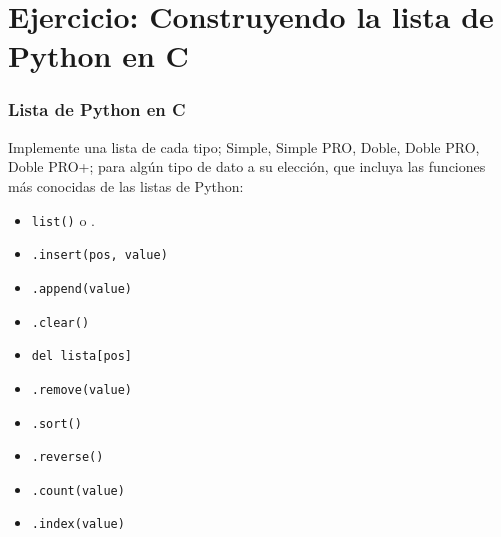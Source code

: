 \documentclass{beamer}
\begin{document}
\section{Ejercicio: Construyendo la lista de Python en C}
\begin{frame}[fragile]
\frametitle{Lista de Python en C}

Implemente una lista de cada tipo; Simple, Simple PRO, Doble, Doble PRO, Doble PRO+; para algún tipo de dato a su elección, que incluya las funciones más conocidas de las listas de Python:

\begin{itemize}
\item \texttt{list()} o \text{[]}.
\item \texttt{.insert(pos, value)}
\item \texttt{.append(value)}
\item \texttt{.clear()}
\item \texttt{del lista[pos]}
\item \texttt{.remove(value)}
\item \texttt{.sort()}
\item \texttt{.reverse()}
\item \texttt{.count(value)}
\item \texttt{.index(value)}
\end{itemize}

\end{frame}
\end{document}
